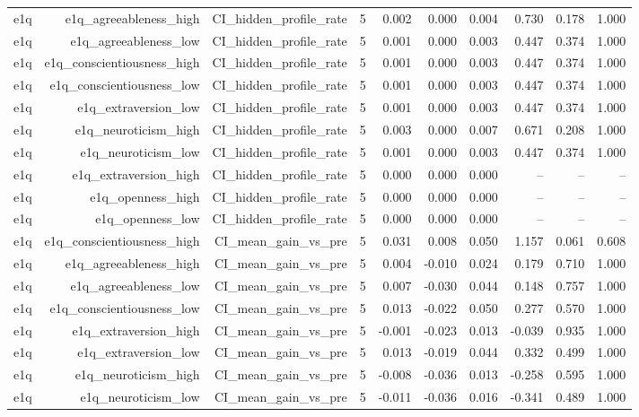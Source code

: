 \documentclass[11pt]{article}
\begin{document}
\begin{landscape}
\begin{longtable}{@{}lrrrrrrrrr@{}}
e1q & e1q\_agreeableness\_high & CI\_hidden\_profile\_rate & 5 & 0.002 & 0.000 & 0.004 & 0.730 & 0.178 & 1.000 \\
e1q & e1q\_agreeableness\_low & CI\_hidden\_profile\_rate & 5 & 0.001 & 0.000 & 0.003 & 0.447 & 0.374 & 1.000 \\
e1q & e1q\_conscientiousness\_high & CI\_hidden\_profile\_rate & 5 & 0.001 & 0.000 & 0.003 & 0.447 & 0.374 & 1.000 \\
e1q & e1q\_conscientiousness\_low & CI\_hidden\_profile\_rate & 5 & 0.001 & 0.000 & 0.003 & 0.447 & 0.374 & 1.000 \\
e1q & e1q\_extraversion\_low & CI\_hidden\_profile\_rate & 5 & 0.001 & 0.000 & 0.003 & 0.447 & 0.374 & 1.000 \\
e1q & e1q\_neuroticism\_high & CI\_hidden\_profile\_rate & 5 & 0.003 & 0.000 & 0.007 & 0.671 & 0.208 & 1.000 \\
e1q & e1q\_neuroticism\_low & CI\_hidden\_profile\_rate & 5 & 0.001 & 0.000 & 0.003 & 0.447 & 0.374 & 1.000 \\
e1q & e1q\_extraversion\_high & CI\_hidden\_profile\_rate & 5 & 0.000 & 0.000 & 0.000 & -- & -- & -- \\
e1q & e1q\_openness\_high & CI\_hidden\_profile\_rate & 5 & 0.000 & 0.000 & 0.000 & -- & -- & -- \\
e1q & e1q\_openness\_low & CI\_hidden\_profile\_rate & 5 & 0.000 & 0.000 & 0.000 & -- & -- & -- \\
e1q & e1q\_conscientiousness\_high & CI\_mean\_gain\_vs\_pre & 5 & 0.031 & 0.008 & 0.050 & 1.157 & 0.061 & 0.608 \\
e1q & e1q\_agreeableness\_high & CI\_mean\_gain\_vs\_pre & 5 & 0.004 & -0.010 & 0.024 & 0.179 & 0.710 & 1.000 \\
e1q & e1q\_agreeableness\_low & CI\_mean\_gain\_vs\_pre & 5 & 0.007 & -0.030 & 0.044 & 0.148 & 0.757 & 1.000 \\
e1q & e1q\_conscientiousness\_low & CI\_mean\_gain\_vs\_pre & 5 & 0.013 & -0.022 & 0.050 & 0.277 & 0.570 & 1.000 \\
e1q & e1q\_extraversion\_high & CI\_mean\_gain\_vs\_pre & 5 & -0.001 & -0.023 & 0.013 & -0.039 & 0.935 & 1.000 \\
e1q & e1q\_extraversion\_low & CI\_mean\_gain\_vs\_pre & 5 & 0.013 & -0.019 & 0.044 & 0.332 & 0.499 & 1.000 \\
e1q & e1q\_neuroticism\_high & CI\_mean\_gain\_vs\_pre & 5 & -0.008 & -0.036 & 0.013 & -0.258 & 0.595 & 1.000 \\
e1q & e1q\_neuroticism\_low & CI\_mean\_gain\_vs\_pre & 5 & -0.011 & -0.036 & 0.016 & -0.341 & 0.489 & 1.000 \\

\end{longtable}
\end{landscape}
\end{document}
